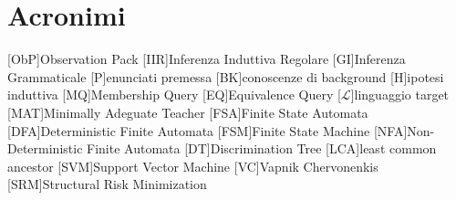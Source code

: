 %
%
\chapter*{Acronimi}
\begin{acronym}[WYSIWYM]
[ObP]{Observation Pack}
[IIR]{Inferenza Induttiva Regolare}
[GI]{Inferenza Grammaticale}
[P]{enunciati premessa}
[BK]{conoscenze di background}
[H]{ipotesi induttiva}
[MQ]{Membership Query}
[EQ]{Equivalence Query}
[$\mathcal{L}$]{linguaggio target}
[MAT]{Minimally Adeguate Teacher}
[FSA]{Finite State Automata}
[DFA]{Deterministic Finite Automata}
[FSM]{Finite State Machine}
[NFA]{Non-Deterministic Finite Automata}
[DT]{Discrimination Tree}
[LCA]{least common ancestor}
[SVM]{Support Vector Machine}
[VC]{Vapnik Chervonenkis}
[SRM]{Structural Risk Minimization}
\end{acronym}